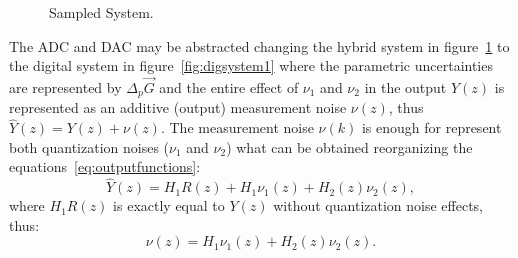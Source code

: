 \documentclass{sig-alternate-05-2015}
\begin{document}
\begin{figure}[htb]
{
}
 \caption{Sampled System. \label{fig:sampledsystem}}
\end{figure}


The ADC and DAC may be abstracted changing the hybrid system in
figure~\ref{fig:sampledsystem} to the digital system in
figure~\ref{fig:digsystem1} where the parametric uncertainties are
represented by $\Delta_p \vec{G}$
%
%
and the entire effect of $\nu_{1}$ and $\nu_{2}$ in the output $Y(z)$ is
represented as an additive (output) measurement noise $\nu(z)$, thus
$\hat{Y}(z)=Y(z)+\nu(z)$.  The measurement noise $\nu(k)$ is enough for
represent both quantization noises ($\nu_{1}$ and $\nu_{2}$) what can be
obtained reorganizing the equations~\ref{eq:outputfunctions}:
%
\begin{equation}
\label{eq:outputfunctions2}
\hat{Y}(z)=H_{1}R(z)+H_{1}\nu_{1}(z)+H_{2}(z)\nu_{2}(z),
\end{equation}
%
where $H_{1}R(z)$ is exactly equal to $Y(z)$ without quantization noise effects, thus:
%
\begin{equation}
\nu(z)=H_{1}\nu_{1}(z)+H_{2}(z)\nu_{2}(z).
\end{equation}
\end{document}
